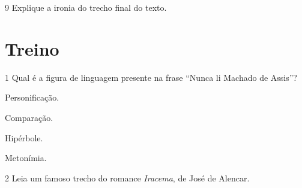\num{9} Explique a ironia do trecho final do texto.


\section*{Treino}

\num{1} Qual é a figura de linguagem presente na frase ``Nunca li Machado de Assis''?

\begin{escolha}

  \item Personificação.
  
  \item Comparação.
  
  \item Hipérbole.
  
  \item Metonímia. 

\end{escolha}

\num{2} Leia um famoso trecho do romance \textit{Iracema}, de José de Alencar.

